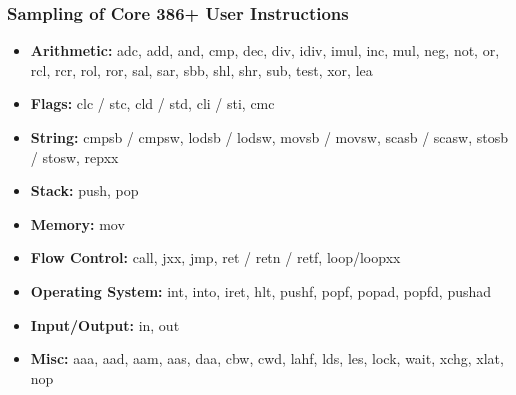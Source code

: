 \documentclass[11pt,xcolor=dvipsnames]{beamer}
\newcommand{\mvs}{\vspace{-0.95em}}
\begin{document}
\begin{frame}[fragile,t]
\frametitle{Sampling of Core 386+ User Instructions}
\mvs
\begin{itemize}
    \item {\bf Arithmetic:} {\ttfamily adc, add, and, cmp, dec, div, idiv, imul, inc, mul, neg, not, or, rcl, rcr, rol, ror, sal, sar, sbb, shl, shr, sub, test, xor, lea}
    \item {\bf Flags:} {\ttfamily clc / stc, cld / std, cli / sti, cmc}
    \item {\bf String:} {\ttfamily cmpsb / cmpsw, lodsb / lodsw, movsb / movsw, scasb / scasw, stosb / stosw, repxx}
    \item {\bf Stack:} {\ttfamily push, pop}
    \item {\bf Memory:} {\ttfamily mov}
    \item {\bf Flow Control:} {\ttfamily call, jxx, jmp, ret / retn / retf, loop/loopxx}
    \item {\bf Operating System:} {\ttfamily int, into, iret, hlt, pushf, popf, popad, popfd, pushad}
    \item {\bf Input/Output:} {\ttfamily in, out}
    \item {\bf Misc:} {\ttfamily aaa, aad, aam, aas, daa, cbw, cwd, lahf, lds, les, lock, wait, xchg, xlat, nop}
\end{itemize}
\end{frame}
\end{document}
